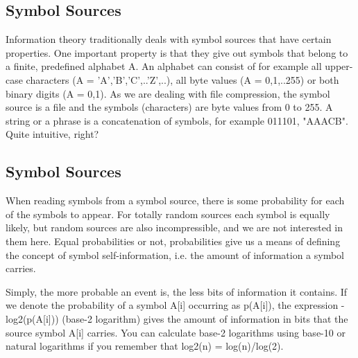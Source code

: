 \begin{frame}
\subsection*{Symbol Sources}

Information theory traditionally deals with symbol sources that have certain properties. 
One important property is that they give out symbols that belong to a finite, predefined alphabet A. 
An alphabet can consist of for example all upper-case characters (A = {'A','B','C',..'Z',..}), all byte values (A = {0,1,..255}) or both binary digits (A = {0,1}).
As we are dealing with file compression, the symbol source is a file and the symbols (characters) are byte values from 0 to 255. 
A string or a phrase is a concatenation of symbols, for example 011101, "AAACB". Quite intuitive, right?

\end{frame}
\begin{frame}
\subsection*{Symbol Sources}

When reading symbols from a symbol source, there is some probability for each of the symbols to appear. 
For totally random sources each symbol is equally likely, but random sources are also incompressible, and we are not interested in them here. 
Equal probabilities or not, probabilities give us a means of defining the concept of symbol self-information, i.e. the amount of information a symbol carries.

Simply, the more probable an event is, the less bits of information it contains. 
If we denote the probability of a symbol A[i] occurring as p(A[i]), the expression -log2(p(A[i])) (base-2 logarithm) gives
 the amount of information in bits that the source symbol A[i] carries. 
You can calculate base-2 logarithms using base-10 or natural logarithms if you remember that log2(n) = log(n)/log(2).
\end{frame}
